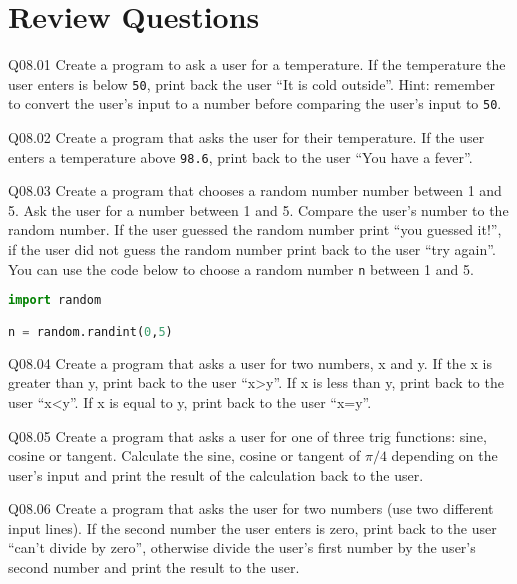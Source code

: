 \documentclass{book}
\newenvironment{problems}{}{}  %
\newcommand{\passthrough}[1]{#1}
\begin{document}
    




    
        \hypertarget{review-questions}{%
\section{Review Questions}\label{review-questions}}
    




    
        \begin{problems}
        Q08.01 Create a program to ask a user for a temperature. If the
temperature the user enters is below \passthrough{\lstinline!50!}, print
back the user ``It is cold outside''. Hint: remember to convert the
user's input to a number before comparing the user's input to
\passthrough{\lstinline!50!}.

Q08.02 Create a program that asks the user for their temperature. If the
user enters a temperature above \passthrough{\lstinline!98.6!}, print
back to the user ``You have a fever''.

Q08.03 Create a program that chooses a random number number between 1
and 5. Ask the user for a number between 1 and 5. Compare the user's
number to the random number. If the user guessed the random number print
``you guessed it!'', if the user did not guess the random number print
back to the user ``try again''. You can use the code below to choose a
random number \passthrough{\lstinline!n!} between 1 and 5.

\begin{lstlisting}[language=Python]
import random

n = random.randint(0,5)
\end{lstlisting}

Q08.04 Create a program that asks a user for two numbers, x and y. If
the x is greater than y, print back to the user ``x\textgreater{}y''. If
x is less than y, print back to the user ``x\textless{}y''. If x is
equal to y, print back to the user ``x=y''.

Q08.05 Create a program that asks a user for one of three trig
functions: sine, cosine or tangent. Calculate the sine, cosine or
tangent of \(\pi/4\) depending on the user's input and print the result
of the calculation back to the user.

Q08.06 Create a program that asks the user for two numbers (use two
different input lines). If the second number the user enters is zero,
print back to the user ``can't divide by zero'', otherwise divide the
user's first number by the user's second number and print the result to
the user.


\end{problems}
\end{document}
